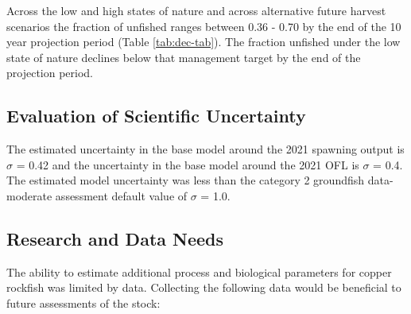 \documentclass[11pt,
  english,
  a4paper,
]{article}
\begin{document}

Across the low and high states of nature and across alternative future harvest scenarios the fraction of unfished ranges between 0.36 - 0.70 by the end of the 10 year projection period (Table \ref{tab:dec-tab}). The fraction unfished under the low state of nature declines below that management target by the end of the projection period.

\leavevmode\tagmcend\tagstructend\par


\hypertarget{evaluation-of-scientific-uncertainty}{%
\subsection{Evaluation of Scientific Uncertainty}\label{evaluation-of-scientific-uncertainty}}

\leavevmode\tagmcend\tagstructend


The estimated uncertainty in the base model around the 2021 spawning output is {\(\sigma\)\leavevmode\tagmcend\tagstructend} = 0.42 and the uncertainty in the base model around the 2021 OFL is {\(\sigma\)\leavevmode\tagmcend\tagstructend} = 0.4. The estimated model uncertainty was less than the category 2 groundfish data-moderate assessment default value of {\(\sigma\)\leavevmode\tagmcend\tagstructend} = 1.0.

\leavevmode\tagmcend\tagstructend\par


\hypertarget{research-and-data-needs}{%
\subsection{Research and Data Needs}\label{research-and-data-needs}}

\leavevmode\tagmcend\tagstructend


The ability to estimate additional process and biological parameters for copper rockfish was limited by data. Collecting the following data would be beneficial to future assessments of the stock:
\end{document}
